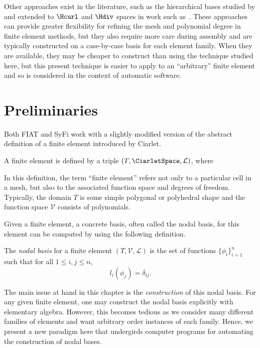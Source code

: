 Other approaches exist in the literature, such as the hierarchical
bases studied by \citet{SzaboBabuska1991}
and extended to $\Hcurl$ and $\Hdiv$ spaces in work such
as~\citet{AinsworthCoyle2003}.  These approaches can provide greater
flexibility for refining the mesh and polynomial degree in finite
element methods, but they also require more care during assembly and are
typically constructed on a case-by-case basis for each element family.
When they are available, they may be cheaper to construct than using the
technique studied here, but this present technique is easier to apply
to an ``arbitrary'' finite element and so is considered in the context
of automatic software.

\section{Preliminaries}

Both FIAT and SyFi work with a slightly modified version of the abstract
definition of a finite element introduced by Ciarlet.
\begin{definition}
  A finite element is defined by a triple
  $(T, \CiarletSpace,\mathcal{L})$, where
  \femdefinition{}
  \label{chap:kirby-1:fedef}
\end{definition}
In this definition, the term ``finite element'' refers not only to a
particular cell in a mesh, but also to the associated function space
and degrees of freedom.  Typically, the domain $T$ is some simple
polygonal or polyhedral shape and the function space $\mathcal{V}$
consists of polynomials.

Given a finite element, a concrete basis, often called the nodal basis,
for this element can be computed by using the following definition.
%
\begin{definition}
The \emph{nodal basis} for a finite element $(T,\mathcal{V},\mathcal{L})$
is the set of functions $\{ \phi_i \}_{i=1}^{n}$ such
that for all $1 \leq i,j \leq n$,
\begin{equation}
l_i(\phi_j) = \delta_{ij}.
\end{equation}
\label{chap:kirby-1:nodaldef}
\end{definition}

The main issue at hand in this chapter is the \emph{construction} of this
nodal basis.  For any given finite element, one may construct the nodal
basis explicitly with elementary algebra.  However, this becomes tedious
as we consider many different families of elements and want arbitrary
order instances of each family.  Hence, we present a new paradigm here
that undergirds computer programs for automating the construction of
nodal bases.

